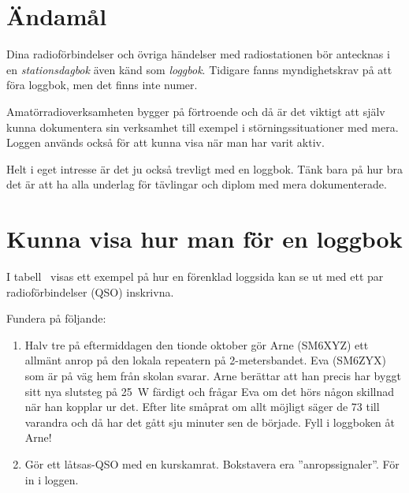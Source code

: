 \section{Ändamål}

Dina radioförbindelser och övriga händelser med radiostationen bör antecknas i
en \emph{stationsdagbok} även känd som \emph{loggbok}.
Tidigare fanns myndighetskrav på att föra loggbok, men det finns inte numer.

Amatörradioverksamheten bygger på förtroende och då är det viktigt att själv
kunna dokumentera sin verksamhet till exempel i störningssituationer med mera.
Loggen används också för att kunna visa när man har varit aktiv.

Helt i eget intresse är det ju också trevligt med en loggbok.
Tänk bara på hur bra det är att ha alla underlag för tävlingar och diplom med
mera dokumenterade.

\section{Kunna visa hur man för en loggbok}

I tabell~ visas ett exempel på hur en förenklad loggsida kan
se ut med ett par radioförbindelser (QSO) inskrivna.

Fundera på följande:
\begin{enumerate}
\item Halv tre på eftermiddagen den tionde oktober gör Arne (SM6XYZ)
  ett allmänt anrop på den lokala repeatern på 2-metersbandet.
  Eva (SM6ZYX) som är på väg hem från skolan svarar.
  Arne berättar att han precis har byggt sitt nya slutsteg på \qty{25}{\watt}
  färdigt och frågar Eva om det hörs någon skillnad när han kopplar ur det.
  Efter lite småprat om allt möjligt säger de 73 till varandra och då har det
  gått sju minuter sen de började.
  Fyll i loggboken åt Arne!
\item Gör ett låtsas-QSO med en kurskamrat.
  Bokstavera era ''anropssignaler''.
  För in i loggen.
\end{enumerate}

